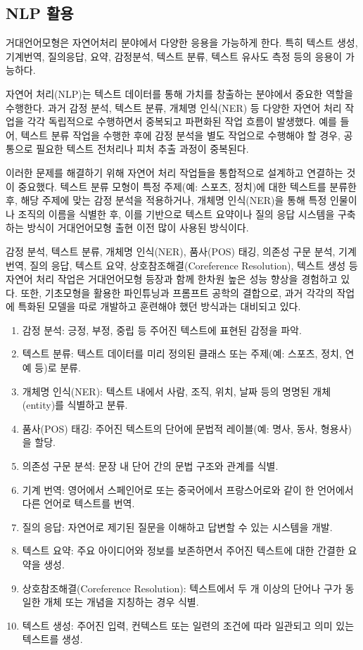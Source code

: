 \documentclass[
  letterpaper,
]{book}
\providecommand{\tightlist}{%
  \setlength{\itemsep}{0pt}\setlength{\parskip}{0pt}}\usepackage{longtable,booktabs,array}
\begin{document}
\hypertarget{nlp-uxd65cuxc6a9}{%
\subsection{NLP 활용}\label{nlp-uxd65cuxc6a9}}

거대언어모형은 자연어처리 분야에서 다양한 응용을 가능하게 한다. 특히
텍스트 생성, 기계번역, 질의응답, 요약, 감정분석, 텍스트 분류, 텍스트
유사도 측정 등의 응용이 가능하다.

자연어 처리(NLP)는 텍스트 데이터를 통해 가치를 창출하는 분야에서 중요한
역할을 수행한다. 과거 감정 분석, 텍스트 분류, 개체명 인식(NER) 등 다양한
자연어 처리 작업을 각각 독립적으로 수행하면서 중복되고 파편화된 작업
흐름이 발생했다. 예를 들어, 텍스트 분류 작업을 수행한 후에 감정 분석을
별도 작업으로 수행해야 할 경우, 공통으로 필요한 텍스트 전처리나 피처
추출 과정이 중복된다.

이러한 문제를 해결하기 위해 자연어 처리 작업들을 통합적으로 설계하고
연결하는 것이 중요했다. 텍스트 분류 모형이 특정 주제(예: 스포츠, 정치)에
대한 텍스트를 분류한 후, 해당 주제에 맞는 감정 분석을 적용하거나, 개체명
인식(NER)을 통해 특정 인물이나 조직의 이름을 식별한 후, 이를 기반으로
텍스트 요약이나 질의 응답 시스템을 구축하는 방식이 거대언어모형 출현
이전 많이 사용된 방식이다.

감정 분석, 텍스트 분류, 개체명 인식(NER), 품사(POS) 태깅, 의존성 구문
분석, 기계 번역, 질의 응답, 텍스트 요약, 상호참조해결(Coreference
Resolution), 텍스트 생성 등 자연어 처리 작업은 거대언어모형 등장과 함께
한차원 높은 성능 향상을 경험하고 있다. 또한, 기초모형을 활용한
파인튜닝과 프롬프트 공학의 결합으로, 과거 각각의 작업에 특화된 모델을
따로 개발하고 훈련해야 했던 방식과는 대비되고 있다.

\begin{enumerate}
\def\labelenumi{\arabic{enumi}.}
\tightlist
\item
  감정 분석: 긍정, 부정, 중립 등 주어진 텍스트에 표현된 감정을 파악.
\item
  텍스트 분류: 텍스트 데이터를 미리 정의된 클래스 또는 주제(예: 스포츠,
  정치, 연예 등)로 분류.
\item
  개체명 인식(NER): 텍스트 내에서 사람, 조직, 위치, 날짜 등의 명명된
  개체(entity)를 식별하고 분류.
\item
  품사(POS) 태깅: 주어진 텍스트의 단어에 문법적 레이블(예: 명사, 동사,
  형용사)을 할당.
\item
  의존성 구문 분석: 문장 내 단어 간의 문법 구조와 관계를 식별.
\item
  기계 번역: 영어에서 스페인어로 또는 중국어에서 프랑스어로와 같이 한
  언어에서 다른 언어로 텍스트를 번역.
\item
  질의 응답: 자연어로 제기된 질문을 이해하고 답변할 수 있는 시스템을
  개발.
\item
  텍스트 요약: 주요 아이디어와 정보를 보존하면서 주어진 텍스트에 대한
  간결한 요약을 생성.
\item
  상호참조해결(Coreference Resolution): 텍스트에서 두 개 이상의 단어나
  구가 동일한 개체 또는 개념을 지칭하는 경우 식별.
\item
  텍스트 생성: 주어진 입력, 컨텍스트 또는 일련의 조건에 따라 일관되고
  의미 있는 텍스트를 생성.
\end{enumerate}
\end{document}
